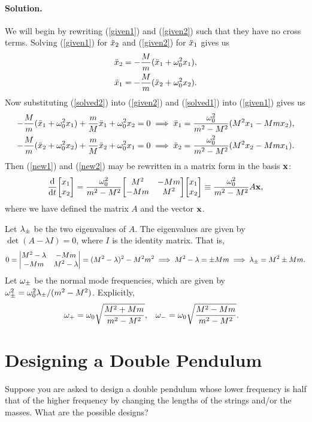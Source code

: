 \documentclass[11pt]{article}
\newcommand{\refeq}[1]{(\ref{#1})}
\newenvironment{statement}
{
    \color{darkgray}
    \ignorespaces
}
{
    \bigskip
}
\newenvironment{solution}
{
    \paragraph{Solution.}
    \ignorespaces
}
{
    \bigskip
}
\begin{document}
\begin{solution}
	We will begin by rewriting \refeq{given1} and \refeq{given2} such that they have no cross terms.  Solving \refeq{given1} for $\ddot{x}_2$ and \refeq{given2} for $\ddot{x}_1$ gives us
	\begin{align}
		\ddot{x}_2 &= -\frac{M}{m} (\ddot{x}_1 + \omega_0^2 x_1), \label{solved2} \\
		\ddot{x}_1 &= -\frac{M}{m} (\ddot{x}_2 + \omega_0^2 x_2). \label{solved1}
	\end{align}
	Now substituting \refeq{solved2} into \refeq{given2} and \refeq{solved1} into \refeq{given1} gives us
	\begin{align}
		-\frac{M}{m} (\ddot{x}_1 + \omega_0^2 x_1) + \frac{m}{M} \ddot{x}_1 + \omega_0^2 x_2 = 0 &\implies \ddot{x}_1 = \frac{\omega_0^2}{m^2 - M^2} (M^2 x_1 - M m x_2), \label{new1} \\
		-\frac{M}{m} (\ddot{x}_2 + \omega_0^2 x_2) + \frac{m}{M} \ddot{x}_2 + \omega_0^2 x_1 = 0 &\implies \ddot{x}_2 = \frac{\omega_0^2}{m^2 - M^2} (M^2 x_2 - M m x_1). \label{new2}
	\end{align}
	Then \refeq{new1} and \refeq{new2} may be rewritten in a matrix form in the basis $\mathbf{x}$:
	\begin{align}
		\dv{}{t} \mqty[ x_1 \\ x_2 ] = \frac{\omo^2}{m^2 - M^2} \mqty[ M^2 & -Mm \\ -Mm & M^2 ] \mqty[ x_1 \\ x_2 ] \equiv \frac{\omo^2}{m^2 - M^2} A \vx,
	\end{align}
	where we have defined the matrix $A$ and the vector $\mathbf{x}$.
	
	Let $\lambda_\pm$ be the two eigenvalues of $A$.  The eigenvalues are given by $\det(A - \lambda I) = 0$, where $I$ is the identity matrix.  That is,
	\begin{align}
		0 = \mdet{M^2 - \lambda & -Mm \\ -Mm & M^2 - \lambda} = (M^2 - \lambda)^2 - M^2 m^2 \implies M^2 - \lambda = \pm Mm \implies \lmpm = M^2 \pm Mm.
	\end{align}
	Let $\omega_\pm$ be the normal mode frequencies, which are given by $\omega_\pm^2 = \omega_0^2 \lambda_\pm / (m^2 - M^2)$.  Explicitly,
	\begin{align}
		\omega_+ &= \omega_0 \sqrt{\frac{M^2 + Mm}{m^2 - M^2}}, &
		\omega_- &= \omega_0 \sqrt{\frac{M^2 - Mm}{m^2 - M^2}}.
	\end{align}
\end{solution}


\section{Designing a Double Pendulum}
\begin{statement}
	Suppose you are asked to design a double pendulum whose lower frequency is half that of the higher frequency by changing the lengths of the strings and/or the masses.  What are the possible designs?
\end{statement}
\end{document}
